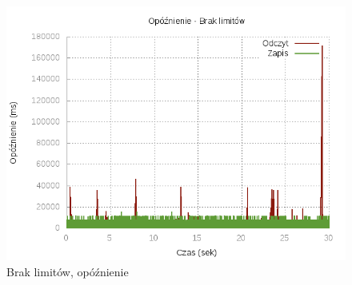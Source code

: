 \begin{figure}[h]
	\centering
	\includegraphics[scale=0.9]{results/Unlimited_lat.png}
		\caption{Brak limitów, opóźnienie}
    \label{fig:unlimited-lat}
\end{figure}

